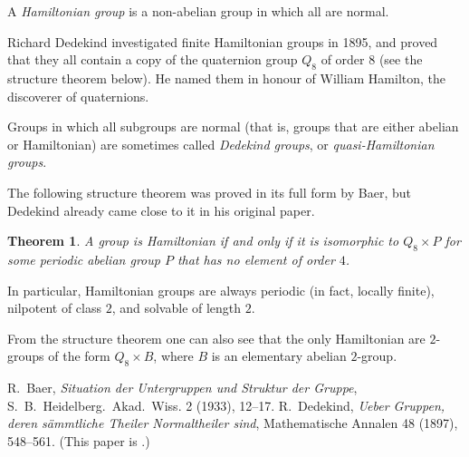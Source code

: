 \documentclass[12pt]{article}
\newtheorem*{thm*}{Theorem}
\begin{document}

A \emph{Hamiltonian group} is a non-abelian group in which all  are normal.

Richard Dedekind investigated finite Hamiltonian groups in 1895, and proved that they all contain a copy of the quaternion group $Q_8$ of order $8$ (see the structure theorem below). He named them in honour of William Hamilton, the discoverer of quaternions.

Groups in which all subgroups are normal (that is, groups that are either abelian or Hamiltonian) are sometimes called \emph{Dedekind groups}, or \emph{quasi-Hamiltonian groups}.

The following structure theorem was proved in its full form by Baer\cite{baer}, but Dedekind already came close to it in his original paper\cite{dedekind}.

\begin{thm*}
A group is Hamiltonian if and only if it is isomorphic to $Q_8\times P$
for some periodic abelian group $P$ that has no element of order $4$.
\end{thm*}

In particular, Hamiltonian groups are always periodic (in fact, locally finite), nilpotent of class $2$, and solvable of length $2$.

From the structure theorem one can also see that the only Hamiltonian  are $2$-groups of the form $Q_8\times B$,
where $B$ is an elementary abelian $2$-group.

\begin{thebibliography}{9}
 R.\ Baer,
 {\it Situation der Untergruppen und Struktur der Gruppe},
 S.\ B.\ Heidelberg.\ Akad.\ Wiss. 2 (1933), 12--17.
 R.\ Dedekind,
 {\it Ueber Gruppen, deren s\"ammtliche Theiler Normaltheiler sind},
 Mathematische Annalen 48 (1897), 548--561. (This paper is
.)
\end{thebibliography}
\end{document}
